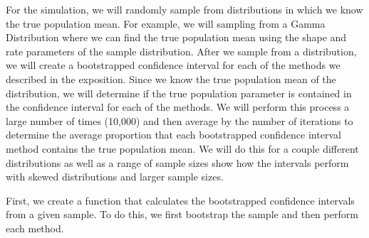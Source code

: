 \documentclass[12pt]{article}
\begin{document}
For the simulation, we will randomly sample from distributions in which
we know the true population mean. For example, we will sampling from a
Gamma Distribution where we can find the true population mean using the
shape and rate parameters of the sample distribution. After we sample
from a distribution, we will create a bootstrapped confidence interval
for each of the methods we described in the exposition. Since we know
the true population mean of the distribution, we will determine if the
true population parameter is contained in the confidence interval for
each of the methods. We will perform this process a large number of
times (10,000) and then average by the number of iterations to determine
the average proportion that each bootstrapped confidence interval method
contains the true population mean. We will do this for a couple
different distributions as well as a range of sample sizes show how the
intervals perform with skewed distributions and larger sample sizes.

First, we create a function that calculates the bootstrapped confidence
intervals from a given sample. To do this, we first bootstrap the sample
and then perform each method.
\end{document}
